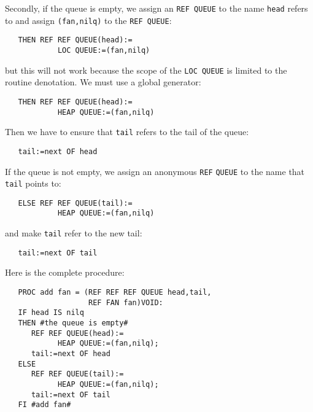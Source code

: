 Secondly, if the queue is empty, we assign an
\verb|REF QUEUE| to the name \verb|head| refers to and assign
\verb|(fan,nilq)| to the \verb|REF QUEUE|:
\begin{verbatim}
   THEN REF REF QUEUE(head):=
            LOC QUEUE:=(fan,nilq)
\end{verbatim}
\noindent
but this will not work because the scope of the \verb|LOC QUEUE| is
limited to the routine denotation. We must use a global generator:
\begin{verbatim}
   THEN REF REF QUEUE(head):=
            HEAP QUEUE:=(fan,nilq)
\end{verbatim}
\noindent
Then we have to ensure that \verb|tail| refers to the tail of the queue:
\begin{verbatim}
   tail:=next OF head
\end{verbatim}
\noindent
If the queue is not empty, we assign an anonymous \verb|REF|
\verb|QUEUE| to the name that \verb|tail| points to:
\begin{verbatim}
   ELSE REF REF QUEUE(tail):=
            HEAP QUEUE:=(fan,nilq)
\end{verbatim}
\noindent
and make \verb|tail| refer to the new tail:
\begin{verbatim}
   tail:=next OF tail
\end{verbatim}
\noindent
Here is the complete procedure:
\begin{verbatim}
   PROC add fan = (REF REF REF QUEUE head,tail,
                   REF FAN fan)VOID:
   IF head IS nilq
   THEN #the queue is empty#
      REF REF QUEUE(head):=
            HEAP QUEUE:=(fan,nilq);
      tail:=next OF head
   ELSE
      REF REF QUEUE(tail):=
            HEAP QUEUE:=(fan,nilq);
      tail:=next OF tail
   FI #add fan#
\end{verbatim}

